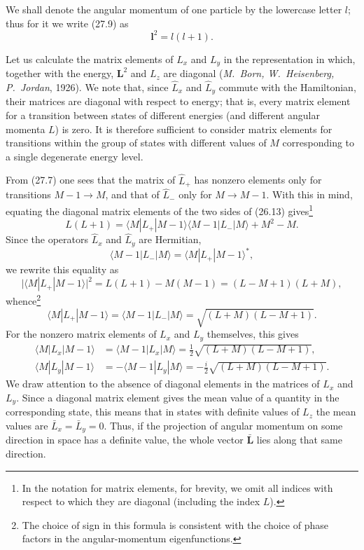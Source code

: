 We shall denote the angular momentum of one particle by the lowercase letter
$l$; thus for it we write (27.9) as
\begin{equation}
  \mathbf l^2=l(l+1).
  \tag{27.11}
\end{equation}

Let us calculate the matrix elements of $L_x$ and $L_y$ in the
representation in which, together with the energy, $\mathbf L^2$ and $L_z$
are diagonal (\emph{M.~Born, W.~Heisenberg, P.~Jordan}, 1926). We note that,
since $\hat L_x$ and $\hat L_y$ commute with the Hamiltonian, their matrices
are diagonal with respect to energy; that is, every matrix element for a
transition between states of different energies (and different angular
momenta $L$) is zero. It is therefore sufficient to consider matrix elements
for transitions within the group of states with different values of $M$
corresponding to a single degenerate energy level.

From (27.7) one sees that the matrix of $\hat L_+$ has nonzero elements
only for transitions $M-1\to M$, and that of $\hat L_-$ only for
$M\to M-1$. With this in mind, equating the diagonal matrix elements of the
two sides of (26.13) gives\footnote{In the notation for matrix elements, for brevity, we omit all
indices with respect to which they are diagonal (including the index $L$).}
\[
  L(L+1)
  =\langle M|L_+|M-1\rangle\langle M-1|L_-|M\rangle+M^2-M.
\]
Since the operators $\hat L_x$ and $\hat L_y$ are Hermitian,
\[
  \langle M-1|L_-|M\rangle=\langle M|L_+|M-1\rangle^*,
\]
we rewrite this equality as
\[
  \bigl|\langle M|L_+|M-1\rangle\bigr|^2
  =L(L+1)-M(M-1)=(L-M+1)(L+M),
\]
whence\footnote{The choice of sign in this formula is consistent with the
choice of phase factors in the angular-momentum eigenfunctions.}
\begin{equation}
  \langle M|L_+|M-1\rangle
  =\langle M-1|L_-|M\rangle
  =\sqrt{(L+M)(L-M+1)}.
  \tag{27.12}
\end{equation}
For the nonzero matrix elements of $L_x$ and $L_y$ themselves, this gives
\begin{equation}
  \begin{aligned}
    \langle M|L_x|M-1\rangle
      &=\langle M-1|L_x|M\rangle
        =\frac12\sqrt{(L+M)(L-M+1)},\\
    \langle M|L_y|M-1\rangle
      &=-\langle M-1|L_y|M\rangle
        =-\frac{i}{2}\sqrt{(L+M)(L-M+1)}.
  \end{aligned}
  \tag{27.13}
\end{equation}
We draw attention to the absence of diagonal elements in the matrices of
$L_x$ and $L_y$. Since a diagonal matrix element gives the mean value of a
quantity in the corresponding state, this means that in states with definite
values of $L_z$ the mean values are $\bar L_x=\bar L_y=0$. Thus, if the
projection of angular momentum on some direction in space has a definite
value, the whole vector $\bar{\mathbf L}$ lies along that same direction.
